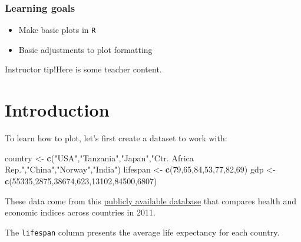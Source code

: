 \documentclass[
]{book}
\newenvironment{Shaded}{\begin{snugshade}}{\end{snugshade}}
\newcommand{\DecValTok}[1]{\textcolor[rgb]{0.00,0.00,0.81}{#1}}
\newcommand{\KeywordTok}[1]{\textcolor[rgb]{0.13,0.29,0.53}{\textbf{#1}}}
\newcommand{\NormalTok}[1]{#1}
\newcommand{\StringTok}[1]{\textcolor[rgb]{0.31,0.60,0.02}{#1}}
\providecommand{\tightlist}{%
  \setlength{\itemsep}{0pt}\setlength{\parskip}{0pt}}
\begin{document}
\hypertarget{learning-goals-5}{%
\subsubsection*{Learning goals}\label{learning-goals-5}}

\begin{itemize}
\tightlist
\item
  Make basic plots in \texttt{R}
\item
  Basic adjustments to plot formatting
\end{itemize}

Instructor tip!Here is some teacher content.

\hypertarget{introduction}{%
\section*{Introduction}\label{introduction}}

To learn how to plot, let's first create a dataset to work with:

\begin{Shaded}
\begin{Highlighting}[]
\NormalTok{country <-}\StringTok{ }\KeywordTok{c}\NormalTok{(}\StringTok{"USA"}\NormalTok{,}\StringTok{"Tanzania"}\NormalTok{,}\StringTok{"Japan"}\NormalTok{,}\StringTok{"Ctr. Africa Rep."}\NormalTok{,}\StringTok{"China"}\NormalTok{,}\StringTok{"Norway"}\NormalTok{,}\StringTok{"India"}\NormalTok{)}
\NormalTok{lifespan <-}\StringTok{ }\KeywordTok{c}\NormalTok{(}\DecValTok{79}\NormalTok{,}\DecValTok{65}\NormalTok{,}\DecValTok{84}\NormalTok{,}\DecValTok{53}\NormalTok{,}\DecValTok{77}\NormalTok{,}\DecValTok{82}\NormalTok{,}\DecValTok{69}\NormalTok{)}
\NormalTok{gdp <-}\StringTok{ }\KeywordTok{c}\NormalTok{(}\DecValTok{55335}\NormalTok{,}\DecValTok{2875}\NormalTok{,}\DecValTok{38674}\NormalTok{,}\DecValTok{623}\NormalTok{,}\DecValTok{13102}\NormalTok{,}\DecValTok{84500}\NormalTok{,}\DecValTok{6807}\NormalTok{)}
\end{Highlighting}
\end{Shaded}

These data come from this \href{https://datasets.iisg.amsterdam/dataset.xhtml?persistentId=hdl:10622/LKYT53}{publicly available database} that compares health and economic indices across countries in 2011.

The \texttt{lifespan} column presents the average life expectancy for each country.
\end{document}

